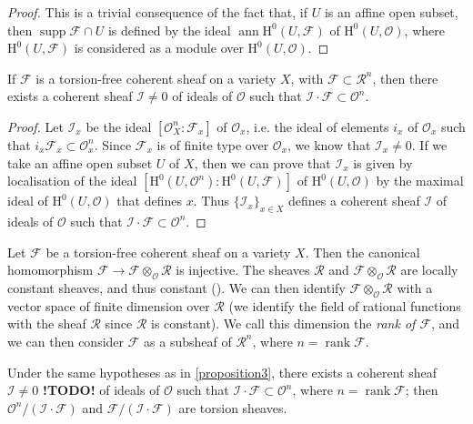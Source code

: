 \documentclass{article}
\theoremstyle{plain}
\newenvironment{proposition}[1]
    {\renewcommand\theinnercustomproposition{#1}\innercustomproposition}
    {\endinnercustomproposition}
\theoremstyle{definition}
\newcommand{\sh}{\mathscr}
\newcommand{\HH}{\mathrm{H}}
\DeclareMathOperator{\ann}{ann}
\DeclareMathOperator{\supp}{supp}
\DeclareMathOperator{\rank}{rank}
\newcommand{\todo}{\textbf{ !TODO! }}
\begin{document}
\begin{proof}
  This is a trivial consequence of the fact that, if $U$ is an affine open subset, then $\supp\sh{F}\cap U$ is defined by the ideal $\ann\HH^0(U,\sh{F})$ of $\HH^0(U,\sh{O})$, where $\HH^0(U,\sh{F})$ is considered as a module over $\HH^0(U,\sh{O})$.
\end{proof}

\begin{proposition}{3}
\label{proposition3}
  If $\sh{F}$ is a torsion-free coherent sheaf on a variety $X$, with $\sh{F}\subset\sh{R}^n$, then there exists a coherent sheaf $\sh{I}\neq0$ of ideals of $\sh{O}$ such that $\sh{I}\cdot\sh{F}\subset\sh{O}^n$.
\end{proposition}

\begin{proof}
  Let $\sh{I}_x$ be the ideal $[\sh{O}_X^n:\sh{F}_x]$ of $\sh{O}_x$, i.e. the ideal of elements $i_x$ of $\sh{O}_x$ such that $i_x\sh{F}_x\subset\sh{O}_x^n$.
  Since $\sh{F}_x$ is of finite type over $\sh{O}_x$, we know that $\sh{I}_x\neq0$.
  If we take an affine open subset $U$ of $X$, then we can prove that $\sh{I}_x$ is given by localisation of the ideal $[\HH^0(U,\sh{O}^n):\HH^0(U,\sh{F})]$ of $\HH^0(U,\sh{O})$ by the maximal ideal of $\HH^0(U,\sh{O})$ that defines $x$.
  Thus $\{\sh{I}_x\}_{x\in X}$ defines a coherent sheaf $\sh{I}$ of ideals of $\sh{O}$ such that $\sh{I}\cdot\sh{F}\subset\sh{O}^n$.
\end{proof}

Let $\sh{F}$ be a torsion-free coherent sheaf on a variety $X$.
Then the canonical homomorphism $\sh{F}\to\sh{F}\otimes_{\sh{O}}\sh{R}$ is injective.
The sheaves $\sh{R}$ and $\sh{F}\otimes_{\sh{O}}\sh{R}$ are locally constant sheaves, and thus constant (\cite[page~229]{5}).
We can then identify $\sh{F}\otimes_{\sh{O}}\sh{R}$ with a vector space of finite dimension over $\sh{R}$ (we identify the field of rational functions with the sheaf $\sh{R}$ since $\sh{R}$ is constant).
We call this dimension the \emph{rank of $\sh{F}$}, and we can then consider $\sh{F}$ as a subsheaf of $\sh{R}^n$, where $n=\rank\sh{F}$.

\begin{proposition}{4}
\label{proposition4}
  Under the same hypotheses as in \cref{proposition3}, there exists a coherent sheaf $\sh{I}\neq0$\todo of ideals of $\sh{O}$ such that $\sh{I}\cdot\sh{F}\subset\sh{O}^n$, where $n=\rank\sh{F}$;
  then $\sh{O}^n/(\sh{I}\cdot\sh{F})$ and $\sh{F}/(\sh{I}\cdot\sh{F})$ are torsion sheaves.
\end{proposition}
\end{document}
